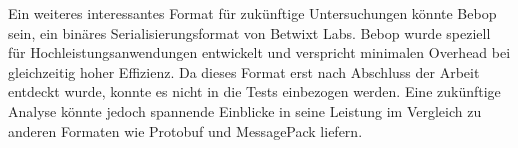 \documentclass[ngerman]{seminarvorlage}
\begin{document}
Ein weiteres interessantes Format für zukünftige Untersuchungen könnte Bebop sein, ein binäres Serialisierungsformat von Betwixt Labs. Bebop wurde speziell für Hochleistungsanwendungen entwickelt und verspricht minimalen Overhead bei gleichzeitig hoher Effizienz. Da dieses Format erst nach Abschluss der Arbeit entdeckt wurde, konnte es nicht in die Tests einbezogen werden. Eine zukünftige Analyse könnte jedoch spannende Einblicke in seine Leistung im Vergleich zu anderen Formaten wie Protobuf und MessagePack liefern. \cite{bebop_serialization}

%
%

\newpage 

\end{document}
